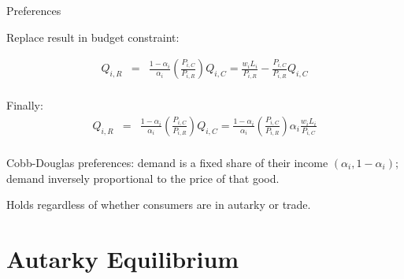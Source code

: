 \documentclass[notes,11pt, aspectratio=169, xcolor=table]{beamer}
\newenvironment{wideitemize}{\itemize\addtolength{\itemsep}{10pt}}{\enditemize}
\begin{document}
\begin{frame}{Preferences}
\begin{wideitemize}
        \item Replace result in budget constraint:

\scriptsize{
\begin{eqnarray*}
    Q_{i,R}&=& \frac{1-\alpha_i}{\alpha_i } \left( \frac{P_{i,C}}{P_{i,R}}\right) Q_{i,C}  = \frac{w_i L_i}{P_{i,R}} - \frac{P_{i,C}}{P_{i,R} } Q_{i,C} \\
\end{eqnarray*}
}

\normalsize
\begin{center}
\end{center}


\item Finally:
{\scriptsize
\begin{eqnarray*}
     Q_{i,R}  &=& \frac{1-\alpha_i}{\alpha_i } \left( \frac{P_{i,C}}{P_{i,R}}\right) Q_{i,C}  = \frac{1-\alpha_i}{\alpha_i } \left( \frac{P_{i,C}}{P_{i,R}}\right) \alpha_i  \frac{w_i L_i}{P_{i,C}} \\
\end{eqnarray*}
}

\begin{center}
\end{center}

\item Cobb-Douglas preferences: demand is a fixed share of their income $(\alpha_i, 1-\alpha_i)$; demand inversely proportional to the price of that good.
\item Holds regardless of whether consumers are in autarky or trade. 

\end{wideitemize}
\end{frame}

\section{Autarky Equilibrium}
\end{document}
